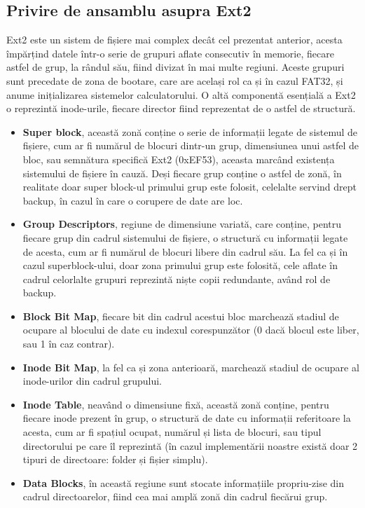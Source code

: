 \subsection{Privire de ansamblu asupra Ext2}

Ext2 este un sistem de fișiere mai complex decât cel prezentat anterior, acesta împărțind datele într-o serie de grupuri aflate consecutiv în memorie, fiecare astfel de grup, la rândul său, fiind divizat în mai multe regiuni. Aceste grupuri sunt precedate de zona de bootare, care are același rol ca și în cazul FAT32, și anume inițializarea sistemelor calculatorului. O altă componentă esențială a Ext2 o reprezintă inode-urile, fiecare director fiind reprezentat de o astfel de structură.

\begin{itemize}
  \item \textbf{Super block}, această zonă conține o serie de informații legate de sistemul de fișiere, cum ar fi numărul de blocuri dintr-un grup, dimensiunea unui astfel de bloc, sau semnătura specifică Ext2 (0xEF53), aceasta marcând existența sistemului de fișiere în cauză. Deși fiecare grup conține o astfel de zonă, în realitate doar super block-ul primului grup este folosit, celelalte servind drept backup, în cazul în care o corupere de date are loc.

  \item \textbf{Group Descriptors}, regiune de dimensiune variată, care conține, pentru fiecare grup din cadrul sistemului de fișiere, o structură cu informații legate de acesta, cum ar fi numărul de blocuri libere din cadrul său. La fel ca și în cazul superblock-ului, doar zona primului grup este folosită, cele aflate în cadrul celorlalte grupuri reprezintă niște copii redundante, având rol de backup.

  \item \textbf{Block Bit Map}, fiecare bit din cadrul acestui bloc marchează stadiul de ocupare al blocului de date cu indexul corespunzător (0 dacă blocul este liber, sau 1 în caz contrar).

  \item \textbf{Inode Bit Map}, la fel ca și zona anterioară, marchează stadiul de ocupare al inode-urilor din cadrul grupului.

  \item \textbf{Inode Table}, neavând o dimensiune fixă, această zonă conține, pentru fiecare inode prezent în grup, o structură de date cu informații referitoare la acesta, cum ar fi spațiul ocupat, numărul și lista de blocuri, sau tipul directorului pe care îl reprezintă (în cazul implementării noastre există doar 2 tipuri de directoare: folder și fișier simplu).

  \item \textbf{Data Blocks}, în această regiune sunt stocate informațiile propriu-zise din cadrul directoarelor, fiind cea mai amplă zonă din cadrul fiecărui grup.
  
\end{itemize}

